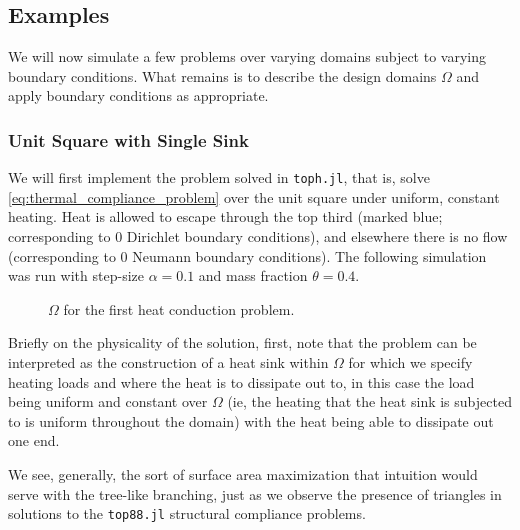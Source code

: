 \subsection{Examples}

We will now simulate a few problems over varying domains subject to varying boundary conditions. What remains is to describe the design domains $\Omega$ and
apply boundary conditions as appropriate.

\subsubsection{Unit Square with Single Sink}\label{sec:thermal_compliance_classic_unit_square}

We will first implement the problem solved in \texttt{toph.jl},
that is, solve \autoref{eq:thermal_compliance_problem} over the unit square under uniform, constant heating.
Heat is allowed to escape through the top third (marked blue; corresponding to $0$ Dirichlet boundary conditions),
and elsewhere there is no flow (corresponding to $0$ Neumann boundary conditions).
The following simulation was run with step-size $\alpha = 0.1$ and mass fraction $\theta = 0.4$.
\begin{figure}[ht]
    \centering
    \caption[b]{$\Omega$ for the first heat conduction problem.}
\end{figure}
Briefly on the physicality of the solution, first, note that the problem can be interpreted as the construction
of a heat sink within $\Omega$ for which we specify heating loads and where the heat is to dissipate out to, in
this case the load being uniform and constant over $\Omega$ (ie, the heating that the heat sink is subjected to
is uniform throughout the domain) with the heat being able to dissipate out one end.

We see, generally, the sort of surface area maximization that intuition would serve with the tree-like branching,
just as we observe the presence of triangles in solutions to the \texttt{top88.jl} structural compliance problems.


